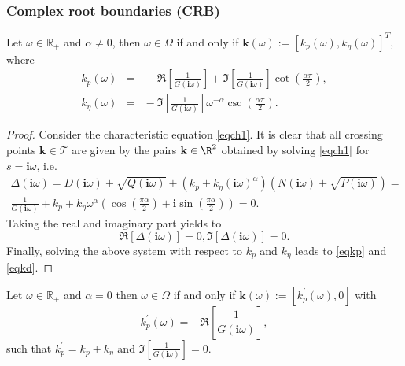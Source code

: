 \documentclass[twoside,reqno,11pt]{fcaa-var} %
\begin{document}
\subsubsection{Complex root boundaries (CRB)}
\begin{proposition} \label{prop:CRB}
	Let $\omega\in\mathbb{R}_+$ and $\alpha\neq0$, then $\omega\in\Omega$ if and only if $\mathbf{k}(\omega):=\left[k_p(\omega),k_\eta(\omega)\right]^T$, where
	\begin{eqnarray}
	k_p(\omega)\!\!\!\!\!\!\!\!&=&\!\!\!\!\!\!\!\! -\Re\!\left[\frac{1}{G(\bm{i}\omega)}\right]\!+\!\Im\!\left[\frac{1}{G(\bm{i}\omega)}\right]\cot\left(\tfrac{\alpha\pi}{2}\right), \label{eqkp}\\
	k_\eta(\omega)\!\!\!\!\!\!\!\!&=& \!\!\!\!\!\!\!\! -\Im\!\left[\frac{1}{G(\bm{i}\omega)}\right]\omega^{-\alpha}\csc\left(\tfrac{\alpha\pi}{2}\right). \label{eqkd}
	\end{eqnarray}
\end{proposition}
\begin{proof}
	Consider the characteristic equation \eqref{eqch1}. It is clear that all crossing points $\mathbf{k}\in\mathcal{T}$ are given by the pairs $\mathbf{k}\in\R^2$ obtained by solving \eqref{eqch1} for $s=\bm{i}\omega$, i.e.
	\begin{multline}
	\Delta(\bm{i}\omega)\!=\!D(\bm{i}\omega)\!+\!\sqrt{Q(\bm{i}\omega)}\!+\!(k_p\!+\!k_\eta(\bm{i}\omega)^\alpha)(N(\bm{i}\omega)\!+\!\sqrt{P(\bm{i}\omega)})\!= \\
	\frac{1}{G(\bm{i}\omega)}+k_p\!+\!k_\eta\omega^\alpha\left(\cos \left(\frac{\pi  \alpha}{2}\right)+\bm{i} \sin \left(\frac{\pi  \alpha}{2}\right)\right)=0.
	\end{multline}	
	Taking the real and imaginary part yields to
	\begin{equation}
	\Re\left[\Delta(\bm{i}\omega)\right]=0,
	\Im\left[\Delta(\bm{i}\omega)\right]=0.
	\end{equation}
	Finally, solving the above system with respect to $k_p$ and $k_\eta$ leads to \eqref{eqkp} and \eqref{eqkd}.
\end{proof}
\begin{proposition}[CRB for $\alpha=0$]\label{prop:CRB2}
	Let $\omega\in\mathbb{R}_+$ and $\alpha=0$ then $\omega\in\Omega$ if and only if $\mathbf{k}(\omega):=\left[k_p^\prime(\omega),0\right]$ with
	\begin{equation} 
	k_p^\prime(\omega)=-\Re\!\left[\frac{1}{G(\bm{i}\omega)}\right],\label{eqkp2}
	\end{equation}
	such that $k_p^\prime=k_p+k_\eta$ and $\Im\!\left[\frac{1}{G(\bm{i}\omega)}\right]=0$.
\end{proposition}
\end{document}
